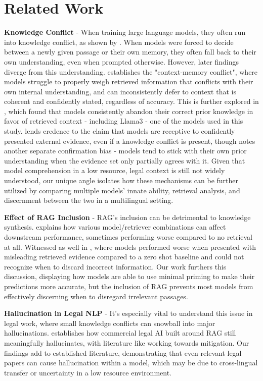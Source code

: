 \documentclass[11pt]{article}
\begin{document}
\section{Related Work}
\textbf{Knowledge Conflict} - When training large language models, they often run into knowledge conflict, as shown by \citep{longpre2021entity}. When models were forced to decide between a newly given passage or their own memory, they often fall back to their own understanding, even when prompted otherwise. However, later findings diverge from this understanding. \citep{xu2024knowledge} establishes the "context-memory conflict", where models struggle to properly weigh retrieved information that conflicts with their own internal understanding, and can inconsistently defer to context that is coherent and confidently stated, regardless of accuracy. This is further explored in \citep{wu2024clasheval}, which found that models consistently abandon their correct prior knowledge in favor of retrieved context - including Llama3 - one of the models used in this study. \citep{xie2024adaptive} lends credence to the claim that models are receptive to confidently presented external evidence, even if a knowledge conflict is present, though notes another separate confirmation bias - models tend to stick with their own prior understanding when the evidence set only partially agrees with it. Given that model comprehension in a low resource, legal context is still not widely understood, our unique angle isolates how these mechanisms can be further utilized by comparing multiple models' innate ability, retrieval analysis, and discernment between the two in a multilingual setting. 

\textbf{Effect of RAG Inclusion} - RAG's inclusion can be detrimental to knowledge synthesis. \citep{hsia2024ragged} explains how various model/retriever combinations can affect downstream performance, sometimes performing worse compared to no retrieval at all. Witnessed as well in \citep{zeng2025ragguard}, where models performed worse when presented with misleading retrieved evidence compared to a zero shot baseline and could not recognize when to discard incorrect information. Our work furthers this discussion, displaying how models are able to use minimal priming to make their predictions more accurate, but the inclusion of RAG prevents most models from effectively discerning when to disregard irrelevant passages. 

\textbf{Hallucination in Legal NLP} - It's especially vital to understand this issue in legal work, where small knowledge conflicts can snowball into major hallucinations. \citep{magesh2025hallucination} establishes how commercial legal AI built around RAG still meaningfully hallucinates, with literature like \citep{reuter2025towards} working towards mitigation. Our findings add to established literature, demonstrating that even relevant legal papers can cause hallucination within a model, which may be due to cross-lingual transfer or uncertainty in a low resource environment.
\end{document}

